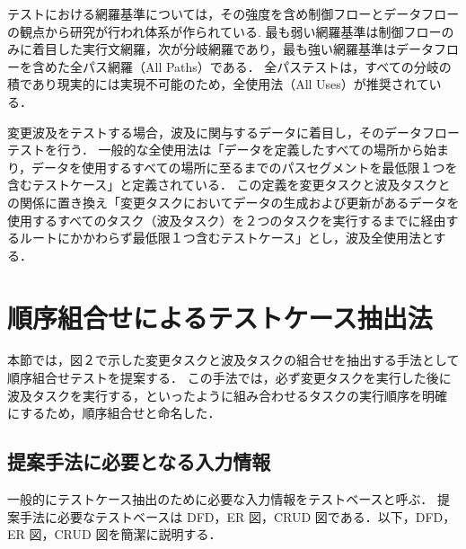 \documentclass[a4paper,12pt]{jreport}
\begin{document}
テストにおける網羅基準については，その強度を含め制御フローとデータフローの観点から研究が行われ体系が作られている\cite{beiz90}.
最も弱い網羅基準は制御フローのみに着目した実行文網羅，次が分岐網羅であり，最も強い網羅基準はデータフローを含めた全パス網羅（All Paths）である．%
全パステストは，すべての分岐の積であり現実的には実現不可能のため，全使用法（All Uses）が推奨されている\cite{beiz90}．

変更波及をテストする場合，波及に関与するデータに着目し，そのデータフローテストを行う．
一般的な全使用法は「データを定義したすべての場所から始まり，データを使用するすべての場所に至るまでのパスセグメントを最低限１つを含むテストケース」と定義されている\cite{beiz90}．
この定義を変更タスクと波及タスクとの関係に置き換え「変更タスクにおいてデータの生成および更新があるデータを使用するすべてのタスク（波及タスク）を２つのタスクを実行するまでに経由するルートにかかわらず最低限１つ含むテストケース」とし，波及全使用法とする．


\section{順序組合せによるテストケース抽出法}

本節では，図２で示した変更タスクと波及タスクの組合せを抽出する手法として順序組合せテストを提案する．
この手法では，必ず変更タスクを実行した後に波及タスクを実行する，といったように組み合わせるタスクの実行順序を明確にするため，順序組合せと命名した．
\subsection{提案手法に必要となる入力情報}
 一般的にテストケース抽出のために必要な入力情報をテストベースと呼ぶ\cite{Demarco}．
提案手法に必要なテストベースは DFD，ER 図，CRUD 図である．以下，DFD，ER 図，CRUD 図を簡潔に説明する．
\end{document}
